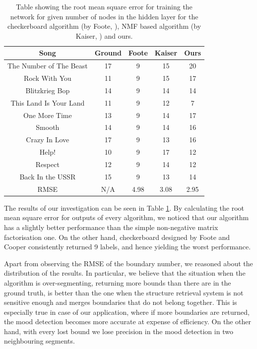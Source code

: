\begin{table}
\begin{center}
\begin{tabular}{| c | c | c | c | c | } \hline 
Song  								& Ground	& Foote 	&  Kaiser 	& Ours \\ \hline \hline
The Number of The Beast 	&	17			& 	9  			&  15 		&  20   	\\ \hline
Rock With You					&	11			&  9			&  15 		& 17   	\\ \hline
Blitzkrieg Bop 					&	14			&  9  			&  14 		& 14   	\\ \hline
This Land Is Your Land 		&	11			&  9			&  12 		& 7    	\\ \hline
One More Time					&	13			&  9    		&  14 		& 17   	\\ \hline
Smooth								&	14			&  9  			&  14 		& 16  	\\ \hline
Crazy In Love					&	17			&  9  			&  13  		& 16   	\\ \hline
Help!									&	10			&  9		   	&  17 		& 12   	\\ \hline
Respect								&	12			&  9  			&  14 		& 12  	\\ \hline
Back In the USSR				&	15			&  9  			&  13		    	& 14		\\ \hline \hline
RMSE								&	N/A		& 4.98		&  3.08		& 2.95	\\ \hline 

\end{tabular}
\caption{Table showing the root mean square error for training the network for given number of nodes in the hidden layer for the checkerboard algorithm (by Foote, \cite{FooteCooper}), NMF based algorithm (by Kaiser, \cite{Sikora}) and ours.}
\label{table:evalStructureCount}
\end{center}
\end{table}


The results of our investigation can be seen in Table \ref{table:evalStructureCount}. By calculating the root mean square error for outputs of every algorithm, we noticed that our algorithm has a slightly better performance than the simple non-negative matrix factorisation one. On the other hand, checkerboard designed by Foote and Cooper consistently returned 9 labels, and hence yielding the worst performance.

Apart from observing the RMSE of the boundary number, we reasoned about the distribution of the results. In particular, we believe that the situation when the algorithm is over-segmenting, returning more bounds than there are in the ground truth, is better than the one when the structure retrieval system is not sensitive enough and merges boundaries that do not belong together. This is especially true in case of our application, where if more boundaries are returned, the mood detection becomes more accurate at expense of efficiency. On the other hand, with every lost bound we lose precision in the mood detection in two neighbouring segments.

